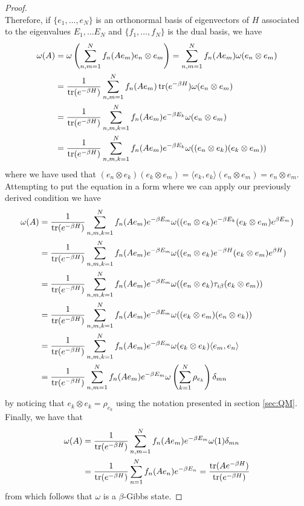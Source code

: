 \begin{proof}
\begin{equation}
\end{equation}
Therefore, if $\{e_1,\dots ,e_N\}$ is an orthonormal basis of eigenvectors of $H$ associated to the eigenvalues $E_1,\dots E_N$ and $\{f_1,\dots,f_N\}$ is the dual basis, we have
\begin{align}
\begin{split}
\omega(A)&=\omega\left(\sum_{n,m=1}^N f_n(Ae_m)e_n\otimes e_m\right)=\sum_{n,m=1}^N f_n(Ae_m)\omega(e_n\otimes e_m) \\
&=\frac{1}{\operatorname{tr}(e^{-\beta H})}\sum_{n,m=1}^N f_n(Ae_m)\operatorname{tr}(e^{-\beta H})\omega(e_n \otimes e_m) \\
&=\frac{1}{\operatorname{tr}(e^{-\beta H})}\sum_{n,m,k=1}^N f_n(Ae_m)e^{-\beta E_k}\omega(e_n\otimes e_m) \\
&=\frac{1}{\operatorname{tr}(e^{-\beta H})}\sum_{n,m,k=1}^Nf_n(Ae_m)e^{-\beta E_k}\omega((e_n\otimes e_k)( e_k\otimes e_m)) \\
\end{split}
\end{align}
where we have used that $(e_n\otimes e_k)(e_k\otimes e_m)=\langle e_k, e_k \rangle (e_n\otimes e_m)=e_n\otimes e_m$. Attempting to put the equation in a form where we can apply our previously derived condition we have
\begin{align}
\begin{split}
\omega(A)&=\frac{1}{\operatorname{tr}(e^{-\beta H})}\sum_{n,m,k=1}^Nf_n(Ae_m)e^{-\beta E_m}\omega((e_n\otimes e_k) e^{-\beta E_k} (e_k\otimes e_m) e^{\beta E_m}) \\
&=\frac{1}{\operatorname{tr}(e^{-\beta H})}\sum_{n,m,k=1}^Nf_n(Ae_m)e^{-\beta E_m}\omega((e_n\otimes e_k) e^{-\beta H} (e_k\otimes e_m) e^{\beta H}) \\
&=\frac{1}{\operatorname{tr}(e^{-\beta H})}\sum_{n,m,k=1}^Nf_n(Ae_m)e^{-\beta E_m}\omega((e_n\otimes e_k) \tau_{i\beta} (e_k\otimes e_m)) \\
&=\frac{1}{\operatorname{tr}(e^{-\beta H})}\sum_{n,m,k=1}^Nf_n(Ae_m)e^{-\beta E_m}\omega( (e_k\otimes e_m)( e_n\otimes e_k))\\
&=\frac{1}{\operatorname{tr}(e^{-\beta H})}\sum_{n,m,k=1}^Nf_n(Ae_m)e^{-\beta E_m}\omega( e_k\otimes e_k)\langle e_m,e_n\rangle\\
&=\frac{1}{\operatorname{tr}(e^{-\beta H})}\sum_{n,m=1}^Nf_n(Ae_m)e^{-\beta E_m}\omega\left(\sum_{k=1}^N \rho_{e_k}\right)\delta_{mn}\\
\end{split}
\end{align}
by noticing that $e_k\otimes e_k=\rho_{e_k}$ using the notation presented in section \ref{sec:QM}. Finally, we have that
\begin{align}
\begin{split}
\omega(A)&=\frac{1}{\operatorname{tr}(e^{-\beta H})}\sum_{n,m=1}^Nf_n(Ae_m)e^{-\beta E_m}\omega(1)\delta_{mn} \\
&=\frac{1}{\operatorname{tr}(e^{-\beta H})}\sum_{n=1}^Nf_n(Ae_n)e^{-\beta E_n} =\frac{\operatorname{tr}(Ae^{-\beta H})}{\operatorname{tr}(e^{-\beta H})}
\end{split}
\end{align}
from which follows that $\omega$ is a $\beta$-Gibbs state.
\end{proof}